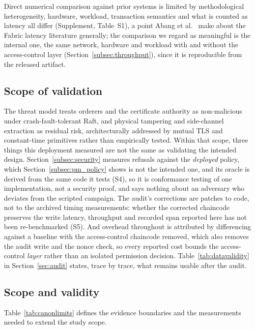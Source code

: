 \documentclass[a4paper,fleqn]{cas-sc}
\begin{document}
Direct numerical comparison against prior systems is limited by
methodological heterogeneity, hardware, workload, transaction semantics
and what is counted as latency all differ (Supplement, Table~S1), a point
Abang et al.~\cite{abang2024latency} make about the Fabric latency
literature generally; the comparison we regard as meaningful is the
internal one, the same network, hardware and workload with and without
the access-control layer (Section~\ref{subsec:throughput}), since it is
reproducible from the released artifact.

\subsection{Scope of validation}
\label{subsec:notvalidated}

The threat model treats orderers and the certificate authority as
non-malicious under crash-fault-tolerant Raft, and physical tampering and
side-channel extraction as residual risk, architecturally addressed by
mutual TLS and constant-time primitives rather than empirically tested.
Within that scope, three things this deployment measured are not the same
as validating the intended design. Section~\ref{subsec:security} measures
refusals against the \emph{deployed} policy, which
Section~\ref{subsec:pm_policy} shows is not the intended one, and its
oracle is derived from the same code it tests (S4), so it is conformance
testing of one implementation, not a security proof, and says nothing
about an adversary who deviates from the scripted campaign. The
audit's corrections are patches to code, not to the archived timing
measurements: whether the corrected chaincode preserves the write latency,
throughput and recorded span reported here has not been re-benchmarked
(S5). And overhead throughout is attributed by differencing against a
baseline with the access-control chaincode removed, which also removes the
audit write and the nonce check, so every reported cost bounds the
access-control \emph{layer} rather than an isolated permission decision.
Table~\ref{tab:datavalidity} in Section~\ref{sec:audit} states, trace
by trace, what remains usable after the audit.

\subsection{Scope and validity}
\label{subsec:limits}
\label{subsec:threats}

Table~\ref{tab:canonlimits} defines the evidence boundaries and the
measurements needed to extend the study scope.
\end{document}
